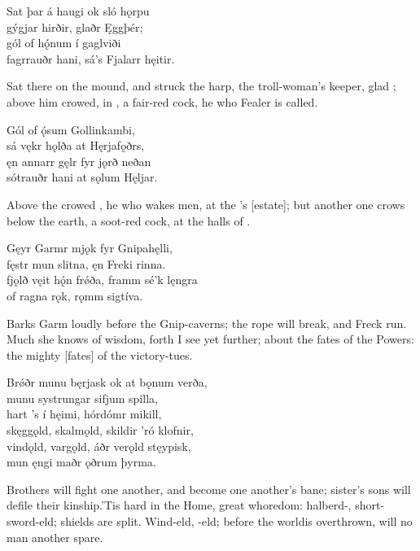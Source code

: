 \bva Sat þar á haugi \hld ok sló hǫrpu \\%
gýgjar hirðir, \hld glaðr Ęggþér; \\%
gól of hǫ́num \hld í gaglviði \\%
fagrrauðr hani, \hld sá’s Fjalarr hęitir.\eva

\bvb Sat there on the mound, and struck the harp, the troll-woman’s keeper, glad ; above him crowed, in , a fair-red cock, he who Fealer is called.\evb

\bva Gól of ǫ́sum \hld Gollinkambi, \\%
sá vękr hǫlða \hld at Hęrjafǫðrs, \\%
ęn annarr gęlr \hld fyr jǫrð neðan \\%
sótrauðr hani \hld at sǫlum Hęljar.\eva

\bvb Above the  crowed , he who wakes men, at the ’s [estate]; but another one crows below the earth, a soot-red cock, at the halls of .\footnotemark[1]\evb
{}

\bva Gęyr Garmr mjǫk \hld fyr Gnipahęlli, \\%
fęstr mun slitna, \hld ęn Freki rinna. \\%
fjǫlð vęit hǫ́n frǿða, \hld framm sé’k lęngra \\%
of ragna rǫk, \hld rǫmm sigtíva.\eva

\bvb Barks Garm loudly before the Gnip-caverns; the rope will break, and Freck run. Much she knows of wisdom, forth I see yet further; about the fates of the Powers: the mighty [fates] of the victory-tues.\evb

\bva Brǿðr munu bęrjask \hld ok at bǫnum verða, \\%
munu systrungar \hld sifjum spilla, \\%
hart ’s í hęimi, \hld hórdómr mikill, \\%
skęggǫld, skalmǫld, \hld skildir ’ró klofnir, \\%
vindǫld, vargǫld, \hld áðr verǫld stęypisk, \\%
mun ęngi maðr \hld ǫðrum þyrma.\eva

\bvb Brothers will fight one another, and become one another’s bane; sister’s sons will defile their kinship.\footnotemark[1] ’Tis hard in the Home, great whoredom: halberd-, short-sword-eld; shields are split. Wind-eld, -eld; before the world\footnotemark[2] is overthrown, will no man another spare.\evb
{}

